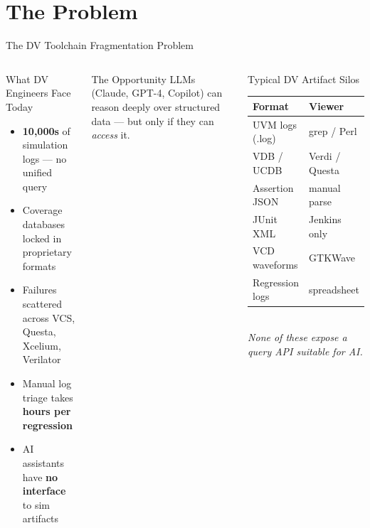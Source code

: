 \documentclass[aspectratio=169,t]{beamer}
\begin{document}
\section{The Problem}
\begin{frame}{The DV Toolchain Fragmentation Problem}
  \begin{columns}[T]
      \begin{alertblock}{What DV Engineers Face Today}
        \begin{itemize}
          \item \textbf{10,000s} of simulation logs — no unified query
          \item Coverage databases locked in proprietary formats
          \item Failures scattered across VCS, Questa, Xcelium, Verilator
          \item Manual log triage takes \textbf{hours per regression}
          \item AI assistants have \textbf{no interface} to sim artifacts
        \end{itemize}
      \end{alertblock}
      \vspace{0.5em}
      \begin{block}{The Opportunity}
        LLMs (Claude, GPT-4, Copilot) can reason deeply over structured
        data — but only if they can \emph{access} it.
      \end{block}

      \begin{exampleblock}{Typical DV Artifact Silos}
        \vspace{0.3em}
        \begin{tabular}{ll}
          \textbf{Format}      & \textbf{Viewer} \\
          \hline
          UVM logs (.log)      & grep / Perl \\
          VDB / UCDB           & Verdi / Questa \\
          Assertion JSON       & manual parse \\
          JUnit XML            & Jenkins only \\
          VCD waveforms        & GTKWave \\
          Regression logs      & spreadsheet \\
        \end{tabular}
        \vspace{0.3em}\\
        \textit{None of these expose a query API suitable for AI.}
      \end{exampleblock}
  \end{columns}
\end{frame}
\end{document}
